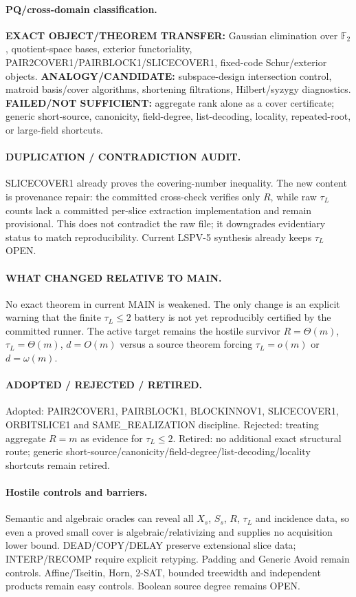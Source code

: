 \documentclass[11pt]{article}
\begin{document}
\paragraph{PQ/cross-domain classification.}
\textbf{EXACT OBJECT/THEOREM TRANSFER:} Gaussian elimination over $\mathbb F_2$, quotient-space bases, exterior functoriality, PAIR2COVER1/PAIRBLOCK1/SLICECOVER1, fixed-code Schur/exterior objects.
\textbf{ANALOGY/CANDIDATE:} subspace-design intersection control, matroid basis/cover algorithms, shortening filtrations, Hilbert/syzygy diagnostics.
\textbf{FAILED/NOT SUFFICIENT:} aggregate rank alone as a cover certificate; generic short-source, canonicity, field-degree, list-decoding, locality, repeated-root, or large-field shortcuts.

\paragraph{DUPLICATION / CONTRADICTION AUDIT.}
SLICECOVER1 already proves the covering-number inequality. The new content is provenance repair: the committed cross-check verifies only $R$, while raw $\tau_L$ counts lack a committed per-slice extraction implementation and remain provisional. This does not contradict the raw file; it downgrades evidentiary status to match reproducibility. Current LSPV-5 synthesis already keeps $\tau_L$ OPEN.

\paragraph{WHAT CHANGED RELATIVE TO MAIN.}
No exact theorem in current MAIN is weakened. The only change is an explicit warning that the finite $\tau_L\le2$ battery is not yet reproducibly certified by the committed runner. The active target remains the hostile survivor $R=\Theta(m)$, $\tau_L=\Theta(m)$, $d=O(m)$ versus a source theorem forcing $\tau_L=o(m)$ or $d=\omega(m)$.

\paragraph{ADOPTED / REJECTED / RETIRED.}
Adopted: PAIR2COVER1, PAIRBLOCK1, BLOCKINNOV1, SLICECOVER1, ORBITSLICE1 and SAME_REALIZATION discipline.
Rejected: treating aggregate $R=m$ as evidence for $\tau_L\le2$.
Retired: no additional exact structural route; generic short-source/canonicity/field-degree/list-decoding/locality shortcuts remain retired.

\paragraph{Hostile controls and barriers.}
Semantic and algebraic oracles can reveal all $X_s$, $S_s$, $R$, $\tau_L$ and incidence data, so even a proved small cover is algebraic/relativizing and supplies no acquisition lower bound. DEAD/COPY/DELAY preserve extensional slice data; INTERP/RECOMP require explicit retyping. Padding and Generic Avoid remain controls. Affine/Tseitin, Horn, 2-SAT, bounded treewidth and independent products remain easy controls. Boolean source degree remains OPEN.
\end{document}
